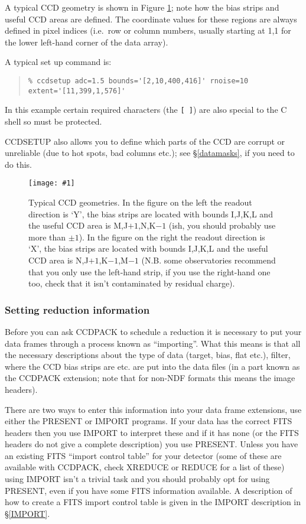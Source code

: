 \documentclass[twoside,11pt]{article}
\newcommand{\htmladdimg}[1]{}
\newcommand{\hyperref}[4]{#2\ref{#4}#3}
\newcommand{\htmlref}[2]{#1}
\renewcommand{\_}{\texttt{\symbol{95}}}
\newenvironment{myquote}{\begin{quote}\begin{small}}{\end{small}\end{quote}}
\newcommand{\text}[1]{{\small \tt #1}}
\newcommand{\routine}[1]{{\sc #1}}
\newcommand{\xroutine}[1]{\htmlref{{\sc #1}}{#1}}
\newcommand{\myfig} [5] {
  \begin{figure}
    \centering\texttt{[image: \#1]}
    \typeout{#1 inserted on page \arabic{page}}
    \caption{\label{#4}#5}
  \end{figure}
  }
\newcommand{\myfig}[5]{
    \htmladdimg{#3}\\
    Figure: \label{#4} #5
    }
\begin{document}
A typical CCD geometry is shown in Figure \ref{CCDPICCY}; note how the
bias strips and useful CCD areas are defined. The coordinate values
for these regions are always defined in pixel indices (i.e.\ row or
column numbers, usually starting at 1,1 for the lower left-hand corner
of the data array).

A typical set up command is:
\begin{myquote}
\begin{verbatim}
% ccdsetup adc=1.5 bounds='[2,10,400,416]' rnoise=10 extent='[11,399,1,576]'
\end{verbatim}
\end{myquote}
In this example certain required characters (the \text{[ ]}) are also
special to the C shell so must be protected.

\xroutine{CCDSETUP} also allows you to define which parts of the CCD are
corrupt or unreliable (due to hot spots, bad columns etc.); see
\hyperref{the section on data-masks}{\S}{}{datamasks}, if you need to do this.

\myfig{sun139geo.eps}{}{geo.gif}{CCDPICCY}{Typical CCD geometries.
In the figure on the left the readout direction is `Y', the bias
strips are located with bounds I,J,K,L and the useful CCD area is
M,J$+1$,N,K$-1$ (ish, you should probably use more than $\pm 1$).  In
the figure on the right the readout direction is `X', the bias strips
are located with bounds I,J,K,L and the useful CCD area is
N,J$+1$,K$-1$,M$-1$ (N.B. some observatories recommend that you only
use the left-hand strip, if you use the right-hand one too, check that
it isn't contaminated by residual charge).}

\subsubsection{Setting reduction information \label{settingreductioninfo}}

Before you can ask CCDPACK to schedule a reduction it is necessary to
put your data frames through a process known as ``importing''. What
this means is that all the necessary descriptions about the type of
data (target, bias, flat etc.), filter, where the CCD bias strips are
etc. are put into the data files (in a part known as the CCDPACK
extension; note that for non-NDF formats this means the image
headers).

There are two ways to enter this information into your data frame
extensions, use either the \xroutine{PRESENT} or \xroutine{IMPORT} programs.
If your data has the correct FITS headers then you use \routine{IMPORT}
to interpret these and if it has none (or the FITS headers do not
give a complete description) you use \routine{PRESENT}. Unless you have
an existing FITS ``import control table'' for your detector (some of these
are available with CCDPACK, check \xroutine{XREDUCE} or \xroutine{REDUCE}
 for a list of these) using \routine{IMPORT}
isn't a trivial task and you should probably opt for using
\routine{PRESENT}, even if you have some FITS information available.
A description of how to create a FITS import control table is given in
the \routine{IMPORT} \hyperref{description}{description in \S}{}{IMPORT}.
\end{document}
